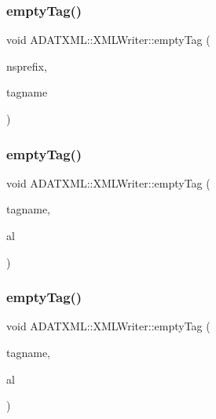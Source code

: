 \subsubsection{\texorpdfstring{emptyTag()}{emptyTag()}\hspace{0.1cm}{\footnotesize\ttfamily [4/8]}}
{\footnotesize\ttfamily void A\+D\+A\+T\+X\+M\+L\+::\+X\+M\+L\+Writer\+::empty\+Tag (\begin{DoxyParamCaption}\item[{const std\+::string \&}]{nsprefix,  }\item[{const std\+::string \&}]{tagname }\end{DoxyParamCaption})}

\mbox{\label{classADATXML_1_1XMLWriter_a48c5adaca1b1c8126047c410c86644f3}} 
\subsubsection{\texorpdfstring{emptyTag()}{emptyTag()}\hspace{0.1cm}{\footnotesize\ttfamily [5/8]}}
{\footnotesize\ttfamily void A\+D\+A\+T\+X\+M\+L\+::\+X\+M\+L\+Writer\+::empty\+Tag (\begin{DoxyParamCaption}\item[{const std\+::string \&}]{tagname,  }\item[{\mbox{\hyperlink{namespaceXMLWriterAPI_a28cf3d8051a4ccf0aef208b7ebc66d07}{X\+M\+L\+Writer\+A\+P\+I\+::\+Attribute\+List}} \&}]{al }\end{DoxyParamCaption})}

\mbox{\label{classADATXML_1_1XMLWriter_a48c5adaca1b1c8126047c410c86644f3}} 
\subsubsection{\texorpdfstring{emptyTag()}{emptyTag()}\hspace{0.1cm}{\footnotesize\ttfamily [6/8]}}
{\footnotesize\ttfamily void A\+D\+A\+T\+X\+M\+L\+::\+X\+M\+L\+Writer\+::empty\+Tag (\begin{DoxyParamCaption}\item[{const std\+::string \&}]{tagname,  }\item[{\mbox{\hyperlink{namespaceXMLWriterAPI_a28cf3d8051a4ccf0aef208b7ebc66d07}{X\+M\+L\+Writer\+A\+P\+I\+::\+Attribute\+List}} \&}]{al }\end{DoxyParamCaption})}

